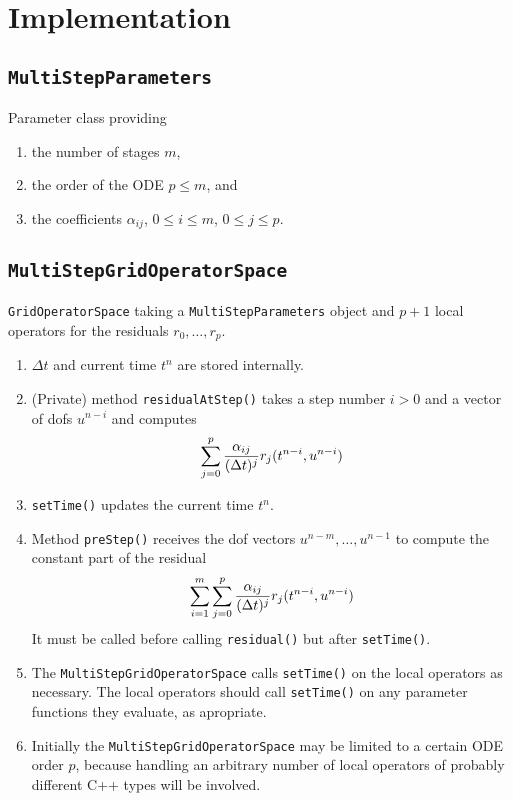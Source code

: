 \documentclass[11pt,a4paper,DIV11,%
notitlepage,oneside,abstracton,%
bibtotoc]{scrartcl}
\begin{document}
\section{Implementation}

\subsection{\tt MultiStepParameters}

Parameter class providing
\begin{enumerate}
\item the number of stages $m$,
\item the order of the ODE $p \leq m$, and
\item the coefficients $\alpha_{ij}$, $0 \leq i \leq m$, $0 \leq j \leq p$.
\end{enumerate}

\subsection{\tt MultiStepGridOperatorSpace}

{\tt GridOperatorSpace} taking a {\tt MultiStepParameters} object and $p+1$
local operators for the residuals $r_0,\ldots,r_p$.
\begin{enumerate}
\item $\Delta t$ and current time $t^n$ are stored internally.
\item (Private) method {\tt residualAtStep()} takes a step number $i>0$ and a
  vector of dofs $u^{n-i}$ and computes
  \begin{equation}
    \sum_{j=0}^p{\alpha_{ij} \over (\Delta t)^j}r_j(t^{n-i},u^{n-i})
  \end{equation}
\item {\tt setTime()} updates the current time $t^n$.
\item Method {\tt preStep()} receives the dof vectors $u^{n-m},\ldots,u^{n-1}$
  to compute the constant part of the residual
  \begin{equation}
    \sum_{i=1}^m\sum_{j=0}^p{\alpha_{ij} \over (\Delta t)^j}r_j(t^{n-i},u^{n-i})
  \end{equation}
  It must be called before calling {\tt residual()} but after {\tt setTime()}.
\item The {\tt MultiStepGridOperatorSpace} calls {\tt setTime()} on the local
  operators as necessary.  The local operators should call {\tt setTime()} on
  any parameter functions they evaluate, as apropriate.
\item Initially the {\tt MultiStepGridOperatorSpace} may be limited to a
  certain ODE order $p$, because handling an arbitrary number of local
  operators of probably different C++ types will be involved.
\end{enumerate}
\end{document}
